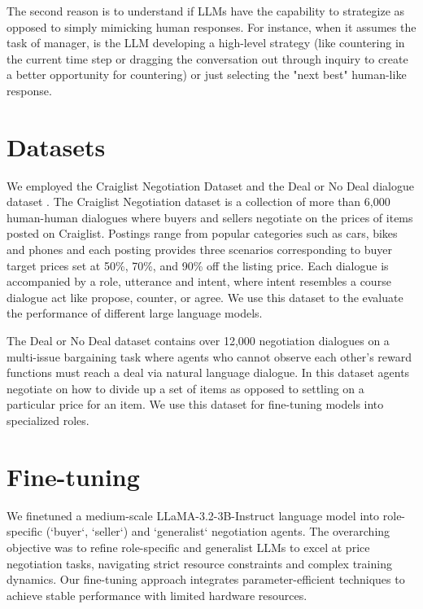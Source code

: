 \documentclass[11pt]{article}
\begin{document}
The second reason is to understand if LLMs have the capability to strategize as opposed to simply mimicking human responses. For instance, when it assumes the task of manager, is the LLM developing a high-level strategy (like countering in the current time step or dragging the conversation out through inquiry to create a better opportunity for countering) or just selecting the "next best" human-like response.


\section{Datasets}
We employed the Craiglist Negotiation Dataset \citep{he-etal-2018} and the Deal or No Deal dialogue dataset \citep{lewis2017dealdealendtoendlearning}. The Craiglist Negotiation dataset is a collection of more than 6,000 human-human dialogues where buyers and sellers negotiate on the prices of items posted on Craiglist. Postings range from popular categories such as cars, bikes and phones and each posting provides three scenarios corresponding to buyer target prices set at 50\%, 70\%, and 90\% off the listing price. Each dialogue is accompanied by a role, utterance and intent, where intent resembles a course dialogue act like propose, counter, or agree. We use this dataset to the evaluate the performance of different large language models. 

The Deal or No Deal dataset contains over 12,000 negotiation dialogues on a multi-issue bargaining task where agents who cannot observe each other’s reward functions must reach a deal via natural language dialogue. In this dataset agents negotiate on how to divide up a set of items as opposed to settling on a particular price for an item. We use this dataset for fine-tuning models into specialized roles.


\section{Fine-tuning}
We finetuned a medium-scale LLaMA-3.2-3B-Instruct language model \citep{touvron2023llamaopenefficientfoundation} into role-specific (`buyer`, `seller`) and `generalist` negotiation agents. The overarching objective was to refine role-specific and generalist LLMs to excel at price negotiation tasks, navigating strict resource constraints and complex training dynamics. Our fine-tuning approach integrates parameter-efficient techniques to achieve stable performance with limited hardware resources.
\end{document}
